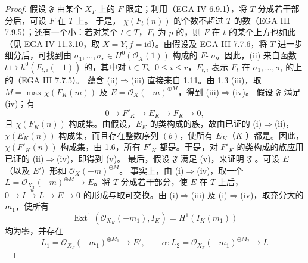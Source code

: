 \begin{proof}
假设 $\mathfrak F$ 由某个 $X_T$ 上的 $F$ 限定；利用（EGA IV 6.9.1），将 $T$ 分成若干部分后，可设 $F$ 在 $T$ 上。
于是， $\chi(F_t(n))$ 的个数不超过 $T$ 的数（EGA III 7.9.5）；还有一个小：若对某个 $t\in T$，$F_t$ 为 $p$ 的，则 $F$ 在 $t$ 的某个上方也如此（见 EGA IV 11.3.10，取 $X=Y,f=\mathrm{id}$）。由假设及 EGA III 7.7.6，将 $T$ 进一步细分后，可找到由 $\sigma_1,\ldots,\sigma_r\in H^0(\mathcal O_X(1))$ 构成的 $F$- $\sigma$。因此，(ii) 来自函数 $t\mapsto h^0(F_{t,i}(-1))$ 的，其中对 $t\in T$、$0\leq i\leq r$，$F_{t,i}$ 表示 $F_t$ 在 $\sigma_1,\ldots,\sigma_i$ 的上的（EGA III 7.7.5）。
蕴含 (ii)$\Rightarrow$(iii) 直接来自 1.11。由 1.3 (iii)，取 $M=\max\chi(F_K(m))$ 及 $E=\mathcal O_X(-m)^{\oplus M}$，得到 (iii)$\Rightarrow$(iv)。
假设 $\mathfrak F$ 满足 (iv)；有
\[0\longrightarrow F'_K\longrightarrow E_K\longrightarrow F_K\longrightarrow0,\]
且 $\chi(F_K(n))$ 构成集。由假设，$E_K$ 的类构成的族，故由已证的 (i)$\Rightarrow$(ii)， $\chi(E_K(n))$ 构成集，而且存在整数序列 $(b)$，使所有 $E_K$（$K$ ）都是。因此， $\chi(F'_K(n))$ 构成集，由 1.6，所有 $F'_K$ 都是。于是，对 $F'_K$ 的类构成的族应用已证的 (ii)$\Rightarrow$(iv)，即得到 (v)。
最后，假设 $\mathfrak F$ 满足 (v)，来证明 $\mathfrak F$ 。可设 $E$（以及 $E'$）形如 $\mathcal O_X(-m)^{\oplus M}$。
事实上，由 (i)$\Rightarrow$(iv)，取一个 $L=\mathcal O_{X_T}(-m)^{\oplus M}\to E$。将 $T$ 分成若干部分，使 $E$ 在 $T$ 上后， $0\to I\xrightarrow{u}L\to E\to0$ 的形成与取可交换。由 (i)$\Rightarrow$(iii) 及 (i)$\Rightarrow$(iv)，取充分大的 $m_1$，使所有
\[\operatorname{Ext}^1(\mathcal O_{X_K}(-m_1),I_K)=H^1(I_K(m_1))\]
均为零，并存在
\[L_1=\mathcal O_{X_T}(-m_1)^{\oplus M_1}\longrightarrow E',\qquad
\alpha:L_2=\mathcal O_{X_T}(-m_1)^{\oplus M_2}\longrightarrow I.\]

\end{proof}
